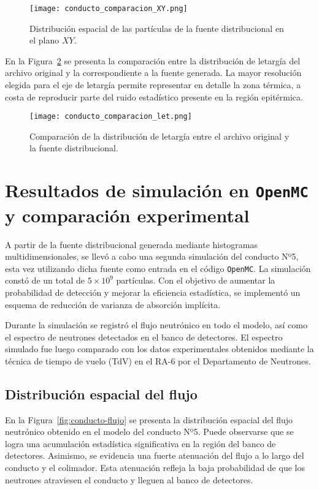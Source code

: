 \begin{figure}[h]
\centering
\texttt{[image: conducto\_comparacion\_XY.png]}
\caption{Distribución espacial de las partículas de la fuente distribucional en el plano $XY$.}
\label{fig:conducto-comparacion-XY}
\end{figure}

En la Figura~\ref{fig:conducto-comparacion-let} se presenta la comparación entre la distribución de letargía del archivo original y la correspondiente a la fuente generada. La mayor resolución elegida para el eje de letargía permite representar en detalle la zona térmica, a costa de reproducir parte del ruido estadístico presente en la región epitérmica.

\begin{figure}[h]
\centering
\texttt{[image: conducto\_comparacion\_let.png]}
\caption{Comparación de la distribución de letargía entre el archivo original y la fuente distribucional.}
\label{fig:conducto-comparacion-let}
\end{figure}

\section{Resultados de simulación en \texttt{OpenMC} y comparación experimental}

A partir de la fuente distribucional generada mediante histogramas multidimensionales, se llevó a cabo una segunda simulación del conducto Nº5, esta vez utilizando dicha fuente como entrada en el código \texttt{OpenMC}. La simulación constó de un total de $5 \times 10^9$ partículas. Con el objetivo de aumentar la probabilidad de detección y mejorar la eficiencia estadística, se implementó un esquema de reducción de varianza de absorción implícita.

Durante la simulación se registró el flujo neutrónico en todo el modelo, así como el espectro de neutrones detectados en el banco de detectores. El espectro simulado fue luego comparado con los datos experimentales obtenidos mediante la técnica de tiempo de vuelo (TdV) en el RA-6 por el Departamento de Neutrones.

\subsection{Distribución espacial del flujo}

En la Figura~\ref{fig:conducto-flujo} se presenta la distribución espacial del flujo neutrónico obtenido en el modelo del conducto Nº5. Puede observarse que se logra una acumulación estadística significativa en la región del banco de detectores. Asimismo, se evidencia una fuerte atenuación del flujo a lo largo del conducto y el colimador. Esta atenuación refleja la baja probabilidad de que los neutrones atraviesen el conducto y lleguen al banco de detectores.


